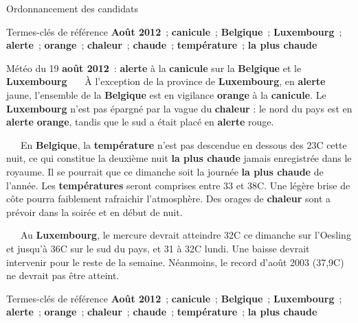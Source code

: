\begin{frame}{Ordonnancement des candidats}
{\begin{exampleblock}
        \begin{exampleblock}{\small Termes-clés de référence}\justifying\small
          \textbf{Août 2012}~; \textbf{canicule}~;
          \textbf{Belgique}~; \textbf{Luxembourg}~; \textbf{alerte}~;
          \textbf{orange}~; \textbf{chaleur}~; \textbf{chaude}~;
          \textbf{température}~; \textbf{la plus chaude}
        \end{exampleblock}
      \end{exampleblock}
    }{
      \begin{exampleblock}{\small
        Météo du 19 \textbf{août 2012}~: \textbf{alerte} à la
        \textbf{canicule} sur la \textbf{Belgique} et le
        \textbf{Luxembourg}
      }\justifying\small
        ~~~À l'exception de la province de \textbf{Luxembourg}, en
        \textbf{alerte} jaune, l'ensemble de la \textbf{Belgique} est en
        vigilance \textbf{orange} à la \textbf{canicule}. Le
        \textbf{Luxembourg} n'est pas épargné par la vague du \textbf{chaleur}
        : le nord du pays est en \textbf{alerte} \textbf{orange}, tandis que
        le sud a était placé en \textbf{alerte} rouge.

        ~~~En \textbf{Belgique}, la \textbf{température} n'est pas descendue
        en dessous des 23\degre{}C cette nuit, ce qui constitue la deuxième nuit
        \textbf{la plus chaude} jamais enregistrée dans le royaume. Il se
        pourrait que ce dimanche soit la journée \textbf{la plus chaude} de
        l'année. Les \textbf{températures} seront comprises entre 33 et
        38\degre{}C. Une légère brise de côte pourra faiblement rafraichir
        l'atmosphère. Des orages de \textbf{chaleur} sont a prévoir dans la
        soirée et en début de nuit.

        ~~~Au \textbf{Luxembourg}, le mercure devrait atteindre 32\degre{}C ce
        dimanche sur l'Oesling et jusqu'à 36\degre{}C sur le sud du pays, et 31 à
        32\degre{}C lundi. Une baisse devrait intervenir pour le reste de la
        semaine. Néanmoins, le record d'août 2003 (37,9\degre{}C) ne devrait pas
        être atteint.

        \begin{exampleblock}{\small Termes-clés de référence}\justifying\small
          \textbf{Août 2012}~; \textbf{canicule}~;
          \textbf{Belgique}~; \textbf{Luxembourg}~; \textbf{alerte}~;
          \textbf{orange}~; \textbf{chaleur}~; \textbf{chaude}~;
          \textbf{température}~; \textbf{la plus chaude}
        \end{exampleblock}
      \end{exampleblock}
    }
  \end{frame}

